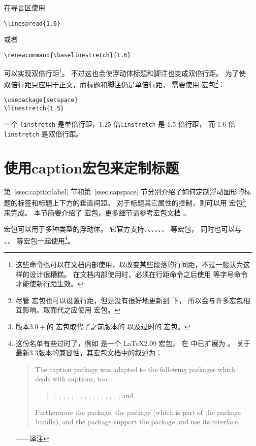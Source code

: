 在导言区使用
\begin{lstlisting}
\linespread{1.6}
\end{lstlisting}
或者
\begin{lstlisting}
\renewcommand{\baselinestretch}{1.6}
\end{lstlisting}
可以实现双倍行距\footnote{
	这些命令也可以在文档内部使用，以改变某些段落的行间距，不过一般认为这样的设计很糟糕。
	在文档内部使用时，必须在行距命令之后使用  等字号命令才能使新行距生效。}。
不过这也会使浮动体标题和脚注也变成双倍行距。
为了使双倍行距只应用于正文，而标题和脚注仍是单倍行距，
需要使用  宏包\footnote{
	尽管  宏包也可以设置行距，但是没有很好地更新到 \LaTeXe{} 下，
	所以会与许多宏包相互影响。取而代之应使用  宏包。}：
\begin{lstlisting}
\usepackage{setspace}
\linestretch{1.5}
\end{lstlisting}
一个 \texttt{linstretch} 是单倍行距，$1.25$ 倍\texttt{linstretch} 是 $1.5$ 倍行距，
而 $1.6$ 倍 \texttt{linstretch} 是双倍行距。


\section{使用caption宏包来定制标题}\label{sec:caption-pkg}

第~\ref{ssec:captionlabel} 节和第~\ref{ssec:capspace} 节分别介绍了如何定制浮动图形的标题的标签和标题上下方的垂直间距。
对于标题其它属性的控制，则可以用  宏包\footnote{
	版本$3.0+$的  宏包取代了之前版本的  以及过时的  宏包。}
来完成。
本节简要介绍了  宏包，更多细节请参考宏包文档 \cite{caption-doc}。

 宏包可以用于多种类型的浮动体。
它官方支持、、、、、、 等宏包，
同时也可以与 、、 等宏包一起使用\footnote{
	这份名单有些过时了，例如  是一个 \LaTeX2.09 宏包，
	在 \LaTeXe{} 中已扩展为 。
	关于最新3.3版本的兼容性，其宏包文档\cite{caption-doc}中的叙述为：
	\begin{quotation}
		The caption package was adapted to the following packages which deals with captions, too:
		
		\begin{quote}
			, , , , , , , , , , , , , , , , and 
		\end{quote}
		
		Furthermore the  package, the  package (which is part of the  package bundle), and the  package support the  package and use its  interface.
	\end{quotation}
	——译注}。

